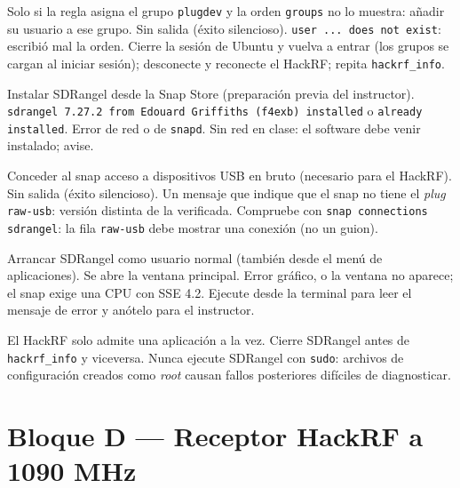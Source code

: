 {Solo si la regla asigna el grupo \texttt{plugdev} y la orden \texttt{groups} no lo muestra: añadir su usuario a ese grupo.}
{Sin salida (éxito silencioso).}
{\texttt{user ... does not exist}: escribió mal la orden.}
{Cierre la sesión de Ubuntu y vuelva a entrar (los grupos se cargan al iniciar sesión); desconecte y reconecte el HackRF; repita \texttt{hackrf\_info}.}

{Instalar SDRangel desde la Snap Store (preparación previa del instructor).}
{\texttt{sdrangel 7.27.2 from Edouard Griffiths (f4exb) installed} o \texttt{already installed}.}
{Error de red o de \texttt{snapd}.}
{Sin red en clase: el software debe venir instalado; avise.}

{Conceder al snap acceso a dispositivos USB en bruto (necesario para el HackRF).}
{Sin salida (éxito silencioso).}
{Un mensaje que indique que el snap no tiene el \emph{plug} \texttt{raw-usb}: versión distinta de la verificada.}
{Compruebe con \texttt{snap connections sdrangel}: la fila \texttt{raw-usb} debe mostrar una conexión (no un guion).}

{Arrancar SDRangel como usuario normal (también desde el menú de aplicaciones).}
{Se abre la ventana principal.}
{Error gráfico, o la ventana no aparece; el snap exige una CPU con SSE 4.2.}
{Ejecute desde la terminal para leer el mensaje de error y anótelo para el instructor.}

\begin{alerta}
El HackRF solo admite una aplicación a la vez. Cierre SDRangel antes de \texttt{hackrf\_info} y viceversa. Nunca ejecute SDRangel con \texttt{sudo}: archivos de configuración creados como \emph{root} causan fallos posteriores difíciles de diagnosticar.
\end{alerta}

\section{Bloque D --- Receptor HackRF a 1090 MHz}
\label{sec:u-receptor}

